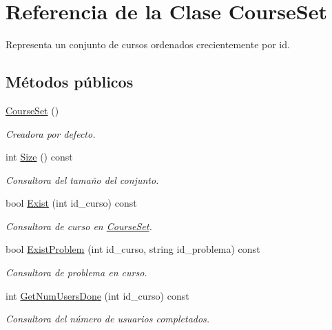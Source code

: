 \hypertarget{class_course_set}{}\section{Referencia de la Clase Course\+Set}
\label{class_course_set}


Representa un conjunto de cursos ordenados crecientemente por id.  


\subsection*{Métodos públicos}
\begin{DoxyCompactItemize}
\item 
\mbox{\hyperlink{class_course_set_ae0b73bd2e6bda115838ba65644e015bc}{Course\+Set}} ()
\begin{DoxyCompactList}\small\item\em Creadora por defecto. \end{DoxyCompactList}\item 
int \mbox{\hyperlink{class_course_set_ac255028f38ba0b5b3ef1994e2a9a6c6f}{Size}} () const
\begin{DoxyCompactList}\small\item\em Consultora del tamaño del conjunto. \end{DoxyCompactList}\item 
bool \mbox{\hyperlink{class_course_set_a1ced9926115a2fbc8058982d148040f1}{Exist}} (int id\+\_\+curso) const
\begin{DoxyCompactList}\small\item\em Consultora de curso en \mbox{\hyperlink{class_course_set}{Course\+Set}}. \end{DoxyCompactList}\item 
bool \mbox{\hyperlink{class_course_set_a3ad118865a697fbb3e5765fc6583346e}{Exist\+Problem}} (int id\+\_\+curso, string id\+\_\+problema) const
\begin{DoxyCompactList}\small\item\em Consultora de problema en curso. \end{DoxyCompactList}\item 
int \mbox{\hyperlink{class_course_set_a46150057534a76182941f23beb2ce4cc}{Get\+Num\+Users\+Done}} (int id\+\_\+curso) const
\begin{DoxyCompactList}\small\item\em Consultora del número de usuarios completados. \end{DoxyCompactList}\item 

\end{DoxyCompactItemize}
